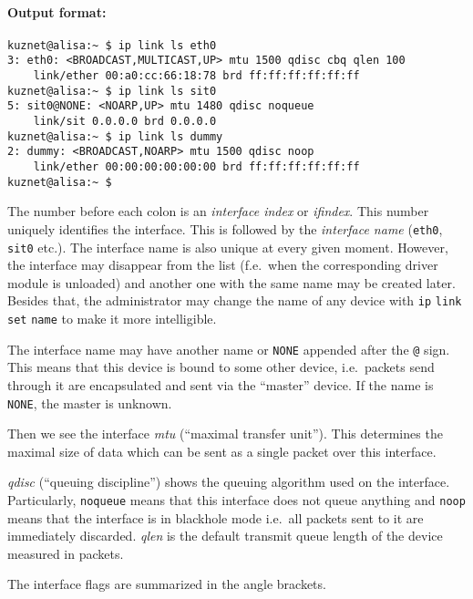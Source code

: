 \paragraph{Output format:}

\begin{verbatim}
kuznet@alisa:~ $ ip link ls eth0
3: eth0: <BROADCAST,MULTICAST,UP> mtu 1500 qdisc cbq qlen 100
    link/ether 00:a0:cc:66:18:78 brd ff:ff:ff:ff:ff:ff
kuznet@alisa:~ $ ip link ls sit0
5: sit0@NONE: <NOARP,UP> mtu 1480 qdisc noqueue
    link/sit 0.0.0.0 brd 0.0.0.0
kuznet@alisa:~ $ ip link ls dummy
2: dummy: <BROADCAST,NOARP> mtu 1500 qdisc noop
    link/ether 00:00:00:00:00:00 brd ff:ff:ff:ff:ff:ff
kuznet@alisa:~ $ 
\end{verbatim}


The number before each colon is an {\em interface index\/} or {\em ifindex\/}.
This number uniquely identifies the interface. This is followed by the {\em interface name\/}
(\verb|eth0|, \verb|sit0| etc.). The interface name is also
unique at every given moment. However, the interface may disappear from the
list (f.e.\ when the corresponding driver module is unloaded) and another
one with the same name may be created later. Besides that,
the administrator may change the name of any device with
\verb|ip| \verb|link| \verb|set| \verb|name|
to make it more intelligible.

The interface name may have another name or \verb|NONE| appended 
after the \verb|@| sign. This means that this device is bound to some other
device,
i.e.\ packets send through it are encapsulated and sent via the ``master''
device. If the name is \verb|NONE|, the master is unknown.

Then we see the interface {\em mtu\/} (``maximal transfer unit''). This determines
the maximal size of data which can be sent as a single packet over this interface.

{\em qdisc\/} (``queuing discipline'') shows the queuing algorithm used
on the interface. Particularly, \verb|noqueue| means that this interface
does not queue anything and \verb|noop| means that the interface is in blackhole
mode i.e.\ all packets sent to it are immediately discarded.
{\em qlen\/} is the default transmit queue length of the device measured
in packets.

The interface flags are summarized in the angle brackets.

